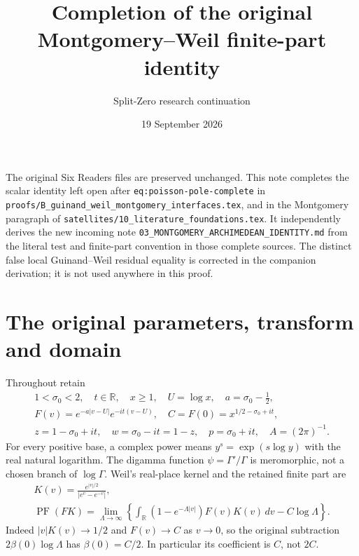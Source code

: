 \documentclass[11pt]{article}
\title{Completion of the original Montgomery--Weil finite-part identity}
\author{Split-Zero research continuation}\date{19 September 2026}
\newcommand{\R}{\mathbb R}\newcommand{\C}{\mathbb C}
\newcommand{\PF}{\operatorname{PF}}\newcommand{\dd}{\,d}
\begin{document}
\maketitle
\noindent The original Six Readers files are preserved unchanged. This note
completes the scalar identity left open after
\texttt{eq:poisson-pole-complete} in
\texttt{proofs/B\_guinand\_weil\_montgomery\_interfaces.tex}, and in the
Montgomery paragraph of
\texttt{satellites/10\_literature\_foundations.tex}.
It independently derives the new incoming note
\texttt{03\_MONTGOMERY\_ARCHIMEDEAN\_IDENTITY.md} from the literal test and
finite-part convention in those complete sources. The distinct false local
Guinand--Weil residual equality is corrected in the companion derivation;
it is not used anywhere in this proof.

\section{The original parameters, transform and domain}
Throughout retain
\begin{equation}\tag{MA1}\begin{gathered}
 1<\sigma_0<2,\quad t\in\R,\quad x\ge1,\quad U=\log x,\quad
 a=\sigma_0-\tfrac12,\\
 F(v)=e^{-a|v-U|}e^{-it(v-U)},\quad
 C=F(0)=x^{1/2-\sigma_0+it},\\
 z=1-\sigma_0+it,\quad w=\sigma_0-it=1-z,\quad
 p=\sigma_0+it,\quad A=(2\pi)^{-1}.
\end{gathered}\end{equation}
For every positive base, a complex power means $y^s=\exp(s\log y)$ with
the real natural logarithm. The digamma function $\psi=\Gamma'/\Gamma$
is meromorphic, not a chosen branch of $\log\Gamma$.
Weil's real-place kernel and the retained finite part \cite{Weil} are
\begin{equation}\tag{MA2}\begin{gathered}
 K(v)=\frac{e^{|v|/2}}{|e^v-e^{-v}|},\\
 \PF(FK)=\lim_{\Lambda\to\infty}
 \left\{\int_\R(1-e^{-\Lambda|v|})F(v)K(v)\dd v-C\log\Lambda\right\}.
\end{gathered}\end{equation}
Indeed $|v|K(v)\to1/2$ and $F(v)\to C$ as $v\to0$, so the original
subtraction $2\beta(0)\log\Lambda$ has $\beta(0)=C/2$. In particular its
coefficient is $C$, not $2C$.
\end{document}
